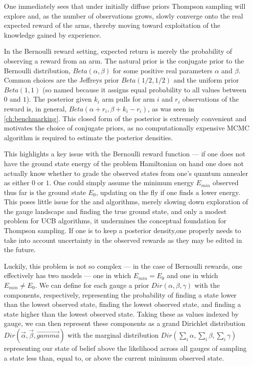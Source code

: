 One immediately sees that under initially diffuse priors Thompson sampling will explore and, as the number of observations grows, slowly converge onto the real expected reward of the arms, thereby moving toward exploitation of the knowledge gained by experience.

In the Bernoulli reward setting, expected return is merely the probability of observing a reward from an arm. The natural prior is the conjugate prior to the Bernoulli distribution, $Beta(\alpha,\beta)$ for some positive real parameters $\alpha$ and $\beta$. Common choices are the Jeffreys prior $Beta(1/2,1/2)$ and the uniform prior $Beta(1,1)$ (so named because it assigns equal probability to all values between $0$ and $1$). The posterior given $k_i$ arm pulls for arm $i$ and $r_i$ observations of the reward is, in general, $Beta(\alpha+r_i,\beta+k_i-r_i)$, as was seen in \ref{ch:benchmarking}. This closed form of the posterior is extremely convenient and motivates the choice of conjugate priors, as no computationally expensive MCMC algorithm is required to estimate the posterior densities.

This highlights a key issue with the Bernoulli reward function --- if one does not have the ground state energy of the problem Hamiltonian on hand one does not actually know whether to grade the observed states from one's quantum annealer as either $0$ or $1$. One could simply assume the minimum energy $E_{min}$ observed thus far is the ground state $E_0$, updating on the fly if one finds a lower energy. This poses little issue for the \eg and \bex algorithms, merely slowing down exploration of the gauge landscape and finding the true ground state, and only a modest problem for UCB algorithms, it undermines the conceptual foundation for Thompson sampling. If one is to keep a posterior density,one properly needs to take into account uncertainty in the observed rewards as they may be edited in the future.

Luckily, this problem is not so complex --- in the case of Bernoulli rewards, one effectively has two models --- one in which $E_{min}=E_0$ and one in which $E_{min}\neq E_0$. We can define for each gauge a prior $Dir(\alpha,\beta,\gamma)$ with the components, respectively, representing the probability of finding a state lower than the lowest observed state, finding the lowest observed state, and finding a state higher than the lowest observed state. Taking these as values indexed by gauge, we can then represent these components as a grand Dirichlet distribution $Dir(\vec{\alpha},\vec{\beta},\vec{gamma})$ with the marginal distribution $Dir(\sum_i \alpha,\sum_i \beta,\sum_i \gamma)$ representing our state of belief above the likelihood across all gauges of sampling a state less than, equal to, or above the current minimum observed state.

